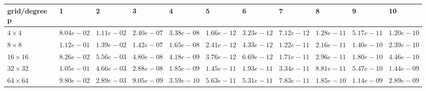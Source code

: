 \begin{tabular}{lllllllllll}
\hline
 grid/degree p   & 1          & 2          & 3          & 4          & 5          & 6          & 7          & 8          & 9          & 10         \\
\hline
 $4 \times 4$    & $8.04e-02$ & $1.11e-02$ & $2.40e-07$ & $3.38e-08$ & $1.66e-12$ & $3.23e-12$ & $7.12e-12$ & $1.28e-11$ & $5.17e-11$ & $1.20e-10$ \\
 $8 \times 8$    & $1.12e-01$ & $1.39e-02$ & $1.42e-07$ & $1.65e-08$ & $2.41e-12$ & $4.33e-12$ & $1.22e-11$ & $2.16e-11$ & $1.40e-10$ & $2.39e-10$ \\
 $16 \times 16$  & $8.26e-02$ & $5.56e-03$ & $4.80e-08$ & $4.18e-09$ & $3.76e-12$ & $6.69e-12$ & $1.71e-11$ & $2.96e-11$ & $1.80e-10$ & $4.46e-10$ \\
 $32 \times 32$  & $1.05e-01$ & $4.66e-03$ & $2.88e-08$ & $1.85e-09$ & $1.45e-11$ & $1.93e-11$ & $3.34e-11$ & $8.81e-11$ & $5.47e-10$ & $1.44e-09$ \\
 $64 \times 64$  & $9.80e-02$ & $2.89e-03$ & $9.05e-09$ & $3.59e-10$ & $5.63e-11$ & $5.31e-11$ & $7.83e-11$ & $1.85e-10$ & $1.14e-09$ & $2.89e-09$ \\
\hline
\end{tabular}